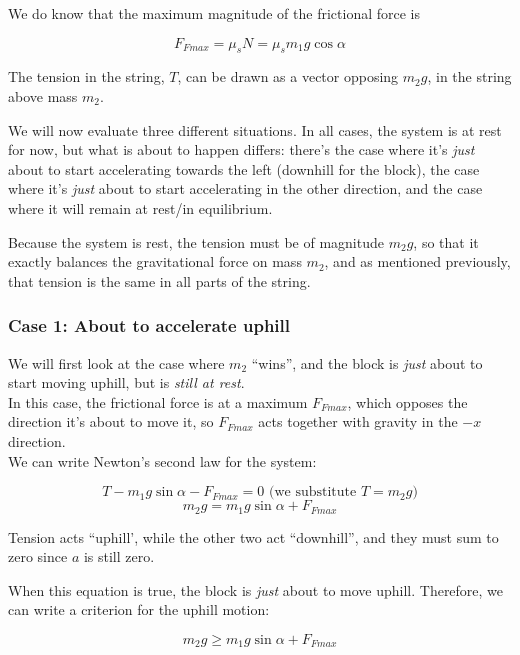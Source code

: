 We do know that the maximum magnitude of the frictional force is

\begin{equation}
F_{Fmax} = \mu_s N = \mu_s m_1 g \cos \alpha
\end{equation}

The tension in the string, $T$, can be drawn as a vector opposing $m_2 g$, in the string above mass $m_2$.

We will now evaluate three different situations. In all cases, the system is at rest for now, but what is about to happen differs: there's the case where it's \emph{just} about to start accelerating towards the left (downhill for the block), the case where it's \emph{just} about to start accelerating in the other direction, and the case where it will remain at rest/in equilibrium.

Because the system is rest, the tension must be of magnitude $m_2 g$, so that it exactly balances the gravitational force on mass $m_2$, and as mentioned previously, that tension is the same in all parts of the string.

\subsubsection{Case 1: About to accelerate uphill}

We will first look at the case where $m_2$ ``wins'', and the block is \emph{just} about to start moving uphill, but is \emph{still at rest}.\\
In this case, the frictional force is at a maximum $F_{Fmax}$, which opposes the direction it's about to move it, so $F_{Fmax}$ acts together with gravity in the $-x$ direction.\\
We can write Newton's second law for the system:

\begin{equation}
T - m_1 g \sin \alpha - F_{Fmax} = 0\text{ (we substitute $T = m_2  g$)}
\end{equation}
\begin{equation}
m_2 g = m_1 g \sin \alpha + F_{Fmax}
\end{equation}

Tension acts ``uphill', while the other two act ``downhill'', and they must sum to zero since $a$ is still zero.

When this equation is true, the block is \emph{just} about to move uphill. Therefore, we can write a criterion for the uphill motion:

\begin{equation}
m_2 g \ge m_1 g \sin \alpha + F_{Fmax}
\end{equation}

